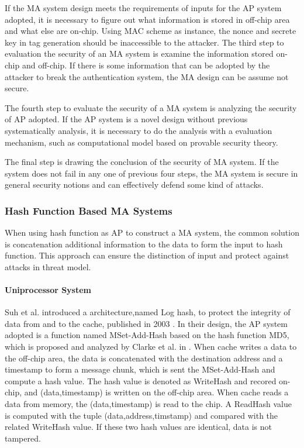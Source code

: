 \documentclass{article}
\begin{document}
If the MA system design meets the requirements of inputs for the AP system adopted, it is necessary to figure out what information is stored in off-chip area and what else are on-chip. Using MAC scheme as instance, the nonce and secrete key in tag generation should be inaccessible to the attacker.  
The third step to evaluation the security of an MA system is examine the information stored on-chip and off-chip. If there is some information that can be adopted by the attacker to break the authentication system, the MA design can be assume not secure.

The fourth step to evaluate the security of a MA system is analyzing the security of AP adopted. If the AP system is a novel design without previous systematically analysis, it is necessary to do the analysis with a evaluation mechanism, such as computational model based on provable security theory.

The final step is drawing the conclusion of the security of MA system. If the system does not fail in any one of previous four steps, the MA system is secure in general security notions and can effectively defend some kind of attacks.
 
\subsubsection{Hash Function Based MA Systems}
When using hash function as AP to construct a MA system, the common solution is concatenation additional information to the data to form the input to hash function. This approach can ensure the distinction of input and protect against attacks in threat model.
\paragraph{Uniprocessor System}
Suh et al. introduced a architecture,named Log hash, to protect the integrity of data from and to the cache, published in 2003 \cite{Suh-MA}.
In their design, the AP system adopted is a function named MSet-Add-Hash based on the hash function MD5, which is proposed and analyzed by Clarke et al. in \cite{Clarke-hash}. When cache writes a data to the off-chip area, the data is concatenated with the destination address and a timestamp to form a message chunk, which is sent the  MSet-Add-Hash and compute a hash value. The hash value is denoted as WriteHash and recored on-chip, and (data,timestamp) is written on the off-chip area.
When cache reads a data from memory, the (data,timestamp) is read to the chip. A ReadHash value is computed with the tuple (data,address,timstamp) and compared with the related WriteHash value. If these two hash values are identical, data is not tampered.
\end{document}
